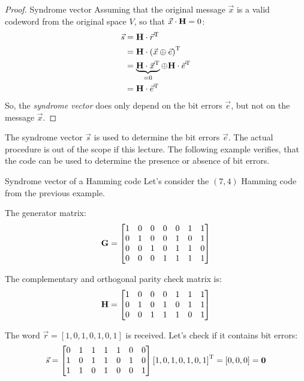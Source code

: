 \begin{refsection}
\begin{proof}{Syndrome vector}
	Assuming that the original message $\vec{x}$ is a valid codeword from the original space $V$, so that $\vec{x} \cdot \bm{\mathrm{H}} = 0$:
	\begin{equation}
		\begin{split}
			\vec{s} &= \bm{\mathrm{H}} \cdot \vec{r}^{\mathrm{T}} \\
			 &= \bm{\mathrm{H}} \cdot \left(\vec{x} \oplus \vec{e}\right)^{\mathrm{T}} \\
			 &= \underbrace{\bm{\mathrm{H}} \cdot \vec{x}^{\mathrm{T}}}_{= 0} \oplus \bm{\mathrm{H}} \cdot \vec{e}^{\mathrm{T}} \\
			 &= \bm{\mathrm{H}} \cdot \vec{e}^{\mathrm{T}}
		\end{split}
	\end{equation}
	So, the \emph{syndrome vector} does only depend on the bit errors $\vec{e}$, but not on the message $\vec{x}$.
\end{proof}

The syndrome vector $\vec{s}$ is used to determine the bit errors $\vec{e}$. The actual procedure is out of the scope if this lecture. The following example verifies, that the code can be used to determine the presence or absence of bit errors.

\begin{example}{Syndrome vector of a Hamming code}
	Let's consider the $(7,4)$ Hamming code from the previous example.
	
	The generator matrix:
	\begin{equation}
		\bm{\mathrm{G}} = \left[\begin{matrix}
			1 & 0 & 0 & 0 & 0 & 1 & 1 \\
			0 & 1 & 0 & 0 & 1 & 0 & 1 \\
			0 & 0 & 1 & 0 & 1 & 1 & 0 \\
			0 & 0 & 0 & 1 & 1 & 1 & 1
		\end{matrix}\right]
	\end{equation}

	The complementary and orthogonal parity check matrix is:
	\begin{equation}
		\bm{\mathrm{H}} = \left[\begin{matrix}
			1 & 0 & 0 & 0 & 1 & 1 & 1 \\
			0 & 1 & 0 & 1 & 0 & 1 & 1 \\
			0 & 0 & 1 & 1 & 1 & 0 & 1
		\end{matrix}\right]
	\end{equation}

	The word $\vec{r} = \left[1, 0, 1, 0, 1, 0, 1\right]$ is received. Let's check if it contains bit errors:
	\begin{equation}
		\vec{s} = \left[\begin{matrix}
			0 & 1 & 1 & 1 & 1 & 0 & 0 \\
			1 & 0 & 1 & 1 & 0 & 1 & 0 \\
			1 & 1 & 0 & 1 & 0 & 0 & 1
		\end{matrix}\right] \left[1, 0, 1, 0, 1, 0, 1\right]^{\mathrm{T}} = \left[0, 0, 0\right] = \bm{\mathrm{\mathrm{0}}}
	\end{equation}
	

\end{example}
\end{refsection}
